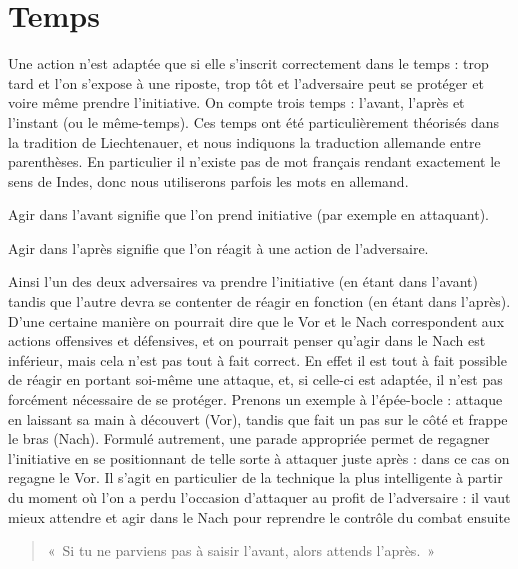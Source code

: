 \section{Temps}



Une action n'est adaptée que si elle s'inscrit correctement dans le temps : trop tard et l'on s'expose à une riposte, trop tôt et l'adversaire peut se protéger et voire même prendre l'initiative.
On compte trois temps : l'avant, l'après et l'instant (ou le même-temps).
Ces temps ont été particulièrement théorisés dans la tradition de Liechtenauer, et nous indiquons la traduction allemande entre parenthèses.
En particulier il n'existe pas de mot français rendant exactement le sens de Indes, donc nous utiliserons parfois les mots en allemand.


\begin{definition}

	Agir dans l'avant signifie que l'on prend initiative (par exemple en attaquant).
\end{definition}


\begin{definition}

	Agir dans l'après signifie que l'on réagit à une action de l'adversaire.
\end{definition}


Ainsi l'un des deux adversaires va prendre l'initiative (en étant dans l'avant) tandis que l'autre devra se contenter de réagir en fonction (en étant dans l'après).
D'une certaine manière on pourrait dire que le Vor et le Nach correspondent aux actions offensives et défensives, et on pourrait penser qu'agir dans le Nach est inférieur, mais cela n'est pas tout à fait correct.
En effet il est tout à fait possible de réagir en portant soi-même une attaque, et, si celle-ci est adaptée, il n'est pas forcément nécessaire de se protéger.
Prenons un exemple à l'épée-bocle : \A attaque en laissant sa main à découvert (Vor), tandis que \D fait un pas sur le côté et frappe le bras (Nach).
Formulé autrement, une parade appropriée permet de regagner l'initiative en se positionnant de telle sorte à attaquer juste après : dans ce cas on regagne le Vor.
Il s'agit en particulier de la technique la plus intelligente à partir du moment où l'on a perdu l'occasion d'attaquer au profit de l'adversaire : il vaut mieux attendre et agir dans le Nach pour reprendre le contrôle du combat ensuite
\begin{quote}
	« Si tu ne parviens pas à saisir l'avant, alors attends l'après. »~\cite[sec.~5, p.~17]{AmheduMaine:2011:LartCombata}
\end{quote}


